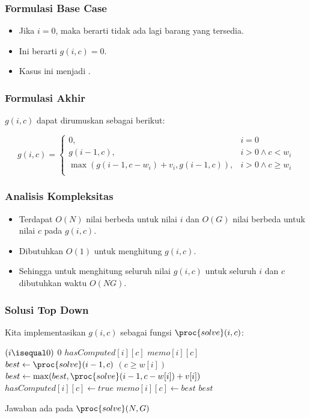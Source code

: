 \begin{frame} 
\frametitle{Formulasi Base Case}
\begin{itemize}
  \item Jika $i=0$, maka berarti tidak ada lagi barang yang tersedia. 
  \item Ini berarti $g(i,c) = 0$.
  \item Kasus ini menjadi \fbasecase.
\end{itemize}
\end{frame}

\begin{frame} 
\frametitle{Formulasi Akhir}
$g(i,c)$ dapat dirumuskan sebagai berikut:
\begin{small}
\[g(i,c) = \left\{\begin{array}{lr}
    0, & i = 0\\
    g(i-1,c), & i > 0 \wedge c < w_i\\
    \max(g(i-1,c-w_i)+v_i,g(i-1,c)), & i > 0 \wedge c \geq w_i\\
    \end{array}\right.\]
\end{small}
\end{frame}

\begin{frame} 
\frametitle{Analisis Kompleksitas}
\begin{itemize}
  \item Terdapat $O(N)$ nilai berbeda untuk nilai $i$ dan $O(G)$ nilai berbeda untuk nilai $c$ pada $g(i,c)$.
  \item Dibutuhkan $O(1)$ untuk menghitung $g(i,c)$. 
  \item Sehingga untuk menghitung seluruh nilai $g(i,c)$ untuk seluruh $i$ dan $c$ dibutuhkan waktu $O(NG)$.
\end{itemize}
\end{frame}

\begin{frame}
\frametitle{Solusi Top Down}
Kita implementasikan $g(i, c)$ sebagai fungsi $\proc{solve}(i,c)$:
\begin{codebox}
\li \If $(i \isequal 0)$ \Then
\li   \Return $0$
\li \ElseIf $hasComputed[i][c]$ \Then
\li   \Return $memo[i][c]$ 
\li \Else
\li   $best \gets \proc{solve}(i-1, c)$
\li   \If $(c \geq w[i])$ \Then
\li     $best \gets \max(best, \proc{solve}(i - 1, c-w[i]) + v[i])$
      \End  
\li   $hasComputed[i][c] \gets true$
\li   $memo[i][c] \gets best$
\li   \Return $best$
    \End
\end{codebox}

Jawaban ada pada $\proc{solve}(N, G)$
\end{frame}


